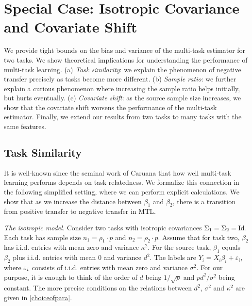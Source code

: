 \section{Special Case: Isotropic Covariance and Covariate Shift}\label{sec_special}

We provide tight bounds on the bias and variance of the multi-task estimator for two tasks.
We show theoretical implications for understanding the performance of multi-task learning.
(a) \textit{Task similarity}: we explain the phenomenon of negative transfer precisely as tasks become more different.
(b) \textit{Sample ratio}: we further explain a curious phenomenon where increasing the sample ratio helps initially, but hurts eventually.
(c) \textit{Covariate shift}: as the source sample size increases, we show that the covariate shift worsens the performance of the multi-task estimator.
Finally, we extend our results from two tasks to many tasks with the same features.




\subsection{Task Similarity}\label{sec_similarity}

It is well-known since the seminal work of Caruana \cite{C97} that how well multi-task learning performs depends on task relatedness.
We formalize this connection in the following simplified setting, where we can perform explicit calculations.
We show that as we increase the distance between $\beta_1$ and $\beta_2$, there is a transition from positive transfer to negative transfer in MTL.

\textit{The isotropic model.}
	Consider two tasks with isotropic covariances $\Sigma_1 = \Sigma_2 = \operatorname{Id}$.
	Each task has sample size $n_1 = \rho_1 \cdot p$ and $n_2 = \rho_2 \cdot p$.
	Assume that for  task two, $\beta_2$ has i.i.d. entries with mean zero and variance $\kappa^2$.
	For the source task, $\beta_1 $ equals $\beta_2$ plus i.i.d. entries with mean $0$ and variance $d^2$.
	The labels are $Y_i = X_i\beta_i + \varepsilon_i$, where ${\varepsilon}_i$ consists of i.i.d. entries with mean zero and variance $\sigma^2$.
	For our purpose, it is enough to think of the order of $d$ being $1/\sqrt{p}$ and $pd^2/\sigma^2$ being constant. The more precise conditions on the relations between $d^2$, $\sigma^2$ and $\kappa^2$ are given in \eqref{choiceofpara}.

